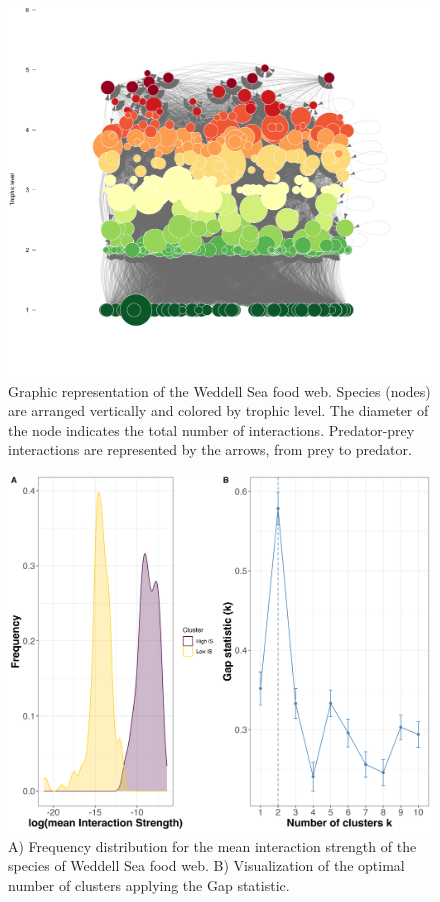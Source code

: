 \documentclass[gc, manuscript]{copernicus}
\begin{document}
\appendixfigures
\clearpage

\begin{figure}
\includegraphics[width=12cm]{App1_FWplot} \caption{Graphic representation of the Weddell Sea food web. Species (nodes) are arranged vertically and colored by trophic level. The diameter of the node indicates the total number of interactions. Predator-prey interactions are represented by the arrows, from prey to predator.}\label{fig:unnamed-chunk-6}
\end{figure}

\clearpage

\begin{figure}
\includegraphics[width=12cm]{App2_Clus_meanIS} \caption{A) Frequency distribution for the mean interaction strength of the species of Weddell Sea food web. B) Visualization of the optimal number of clusters applying the Gap statistic.}\label{fig:unnamed-chunk-7}
\end{figure}
\end{document}
